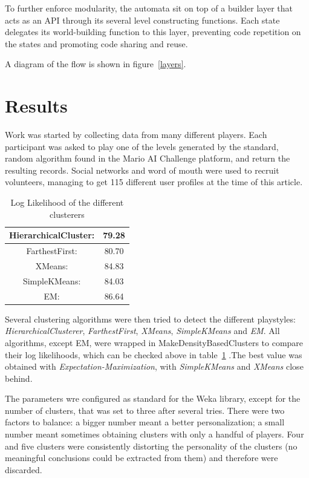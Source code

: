\documentclass[conference]{IEEEtran}
\begin{document}
To further enforce modularity, the automata sit on top of a builder layer that acts as an API through its several level constructing functions. Each state delegates its world-building function to this layer, preventing code repetition on the states and promoting code sharing and reuse.

A diagram of the flow is shown in figure~\ref{layers}.

\section{Results}

Work was started by collecting data from many different players. Each participant was asked to play one of the levels generated by the standard, random algorithm found in the Mario AI Challenge platform, and return the resulting records. Social networks and word of mouth were used to recruit volunteers, managing to get 115 different user profiles at the time of this article.


\begin{table}
\begin{center}
\renewcommand{\arraystretch}{1.3}
\caption{Log Likelihood of the different clusterers}
\label{tableloglikelihood}
\begin{tabular}{|c|c|}
\hline
HierarchicalCluster: & 79.28\\
\hline
FarthestFirst: & 80.70\\
\hline
XMeans: & 84.83 \\
\hline
SimpleKMeans: & 84.03 \\
\hline
EM: & 86.64 \\
\hline
\end{tabular}
\end{center}
\end{table}

Several clustering algorithms were then tried to detect the different playstyles: \textit{HierarchicalClusterer}, \textit{FarthestFirst}, \textit{XMeans}, \textit{SimpleKMeans} and \textit{EM}.
All algorithms, except EM, were wrapped in MakeDensityBasedClusters to compare their log likelihoods, which can be checked above in table~\ref{tableloglikelihood} .The best value was obtained with \textit{Expectation-Maximization}, with \textit{SimpleKMeans} and \textit{XMeans} close behind. 

The parameters wre configured as standard for the Weka library, except for the number of clusters, that was set to three after several tries. There were two factors to balance: a bigger number meant a better personalization; a small number meant sometimes obtaining clusters with only a handful of players. Four and five clusters were consistently distorting the personality of the clusters (no meaningful conclusions could be extracted from them) and therefore were discarded.
\end{document}
